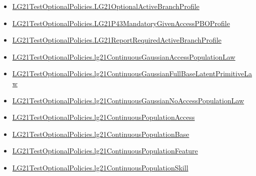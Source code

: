 \documentclass[10pt]{article}
\begin{document}
\begin{itemize}
\item \hyperlink{governing-declaration-4f1e0bb5ec5b1259}{LG21\allowbreak{}Test\allowbreak{}Optional\allowbreak{}Policies.\allowbreak{}LG21\allowbreak{}Optional\allowbreak{}Active\allowbreak{}Branch\allowbreak{}Profile}
\item \hyperlink{governing-declaration-42170088e71db81a}{LG21\allowbreak{}Test\allowbreak{}Optional\allowbreak{}Policies.\allowbreak{}LG21\allowbreak{}P43\allowbreak{}Mandatory\allowbreak{}Given\allowbreak{}Access\allowbreak{}PBO\allowbreak{}Profile}
\item \hyperlink{governing-declaration-a4ca58af5822aaeb}{LG21\allowbreak{}Test\allowbreak{}Optional\allowbreak{}Policies.\allowbreak{}LG21\allowbreak{}Report\allowbreak{}Required\allowbreak{}Active\allowbreak{}Branch\allowbreak{}Profile}
\item \hyperlink{governing-declaration-fa49b6c4b938413f}{LG21\allowbreak{}Test\allowbreak{}Optional\allowbreak{}Policies.\allowbreak{}lg21\allowbreak{}Continuous\allowbreak{}Gaussian\allowbreak{}Access\allowbreak{}Population\allowbreak{}Law}
\item \hyperlink{governing-declaration-20f56d0090cb85ed}{LG21\allowbreak{}Test\allowbreak{}Optional\allowbreak{}Policies.\allowbreak{}lg21\allowbreak{}Continuous\allowbreak{}Gaussian\allowbreak{}Full\allowbreak{}Base\allowbreak{}Latent\allowbreak{}Primitive\allowbreak{}Law}
\item \hyperlink{governing-declaration-cb63da3a1a7a6c13}{LG21\allowbreak{}Test\allowbreak{}Optional\allowbreak{}Policies.\allowbreak{}lg21\allowbreak{}Continuous\allowbreak{}Gaussian\allowbreak{}No\allowbreak{}Access\allowbreak{}Population\allowbreak{}Law}
\item \hyperlink{governing-declaration-236b49e8ec9172d2}{LG21\allowbreak{}Test\allowbreak{}Optional\allowbreak{}Policies.\allowbreak{}lg21\allowbreak{}Continuous\allowbreak{}Population\allowbreak{}Access}
\item \hyperlink{governing-declaration-3b5146b167dee236}{LG21\allowbreak{}Test\allowbreak{}Optional\allowbreak{}Policies.\allowbreak{}lg21\allowbreak{}Continuous\allowbreak{}Population\allowbreak{}Base}
\item \hyperlink{governing-declaration-f07391974a356bb7}{LG21\allowbreak{}Test\allowbreak{}Optional\allowbreak{}Policies.\allowbreak{}lg21\allowbreak{}Continuous\allowbreak{}Population\allowbreak{}Feature}
\item \hyperlink{governing-declaration-339ce55dcb78dfb9}{LG21\allowbreak{}Test\allowbreak{}Optional\allowbreak{}Policies.\allowbreak{}lg21\allowbreak{}Continuous\allowbreak{}Population\allowbreak{}Skill}

\end{itemize}
\end{document}
